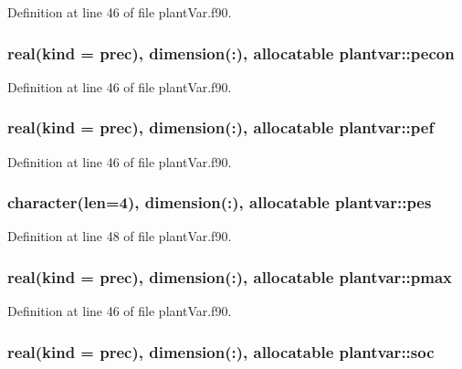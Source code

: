 Definition at line 46 of file plant\-Var.\-f90.

\hypertarget{classplantvar_a5f4279bfe683122d1505b7df5897ac45}{
\subsubsection[{pecon}]{\setlength{\rightskip}{0pt plus 5cm}real(kind = prec), dimension(\-:), allocatable plantvar\-::pecon}}\label{classplantvar_a5f4279bfe683122d1505b7df5897ac45}


Definition at line 46 of file plant\-Var.\-f90.

\hypertarget{classplantvar_adae0478dc0dc873750b3f2ff1cd17f47}{
\subsubsection[{pef}]{\setlength{\rightskip}{0pt plus 5cm}real(kind = prec), dimension(\-:), allocatable plantvar\-::pef}}\label{classplantvar_adae0478dc0dc873750b3f2ff1cd17f47}


Definition at line 46 of file plant\-Var.\-f90.

\hypertarget{classplantvar_a8b75644cc6f0b1728b0fdcd7c575c177}{
\subsubsection[{pes}]{\setlength{\rightskip}{0pt plus 5cm}character(len=4), dimension(\-:), allocatable plantvar\-::pes}}\label{classplantvar_a8b75644cc6f0b1728b0fdcd7c575c177}


Definition at line 48 of file plant\-Var.\-f90.

\hypertarget{classplantvar_aab06737bb534df1a69fff1f6f601a72a}{
\subsubsection[{pmax}]{\setlength{\rightskip}{0pt plus 5cm}real(kind = prec), dimension(\-:), allocatable plantvar\-::pmax}}\label{classplantvar_aab06737bb534df1a69fff1f6f601a72a}


Definition at line 46 of file plant\-Var.\-f90.

\hypertarget{classplantvar_abcd233bb37be100040f7c48ba5700daa}{
\subsubsection[{soc}]{\setlength{\rightskip}{0pt plus 5cm}real(kind = prec), dimension(\-:), allocatable plantvar\-::soc}}\label{classplantvar_abcd233bb37be100040f7c48ba5700daa}


